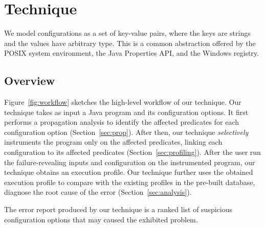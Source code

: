 \section{Technique}
\label{sec:technique}

We model configurations as a set of key-value pairs, where
the keys are strings and the values have arbitrary type. This is
a common abstraction offered
by the POSIX system environment, the Java Properties API,
and the Windows registry.


\subsection{Overview}





Figure~\ref{fig:workflow} sketches the high-level workflow of our technique.
Our technique takes as input a Java program and its configuration options.
It first performs a propagation analysis to identify
the affected predicates for each configuration option (Section~\ref{sec:prop}).
After then, our technique \textit{selectively} instruments
the program only on the affected predicates, linking each configuration
to its affected predicates (Section~\ref{sec:profiling}).
After the user run the failure-revealing inputs and configuration
on the instrumented program, our technique obtains an execution profile.
Our technique further uses the obtained execution profile
to compare with the existing profiles in the pre-built database,
diagnose the root cause of the error (Section~\ref{sec:analysis}).

The error report produced by our technique is a ranked list
of suspicious configuration options that may caused the exhibited problem.




